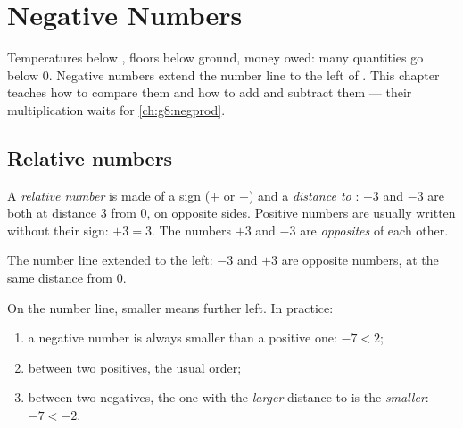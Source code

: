 \chapter{Negative Numbers}\label{ch:g7:negatives}

Temperatures below , floors below ground, money owed: many
quantities go below $0$. Negative numbers extend the number line to the
left of . This chapter teaches how to compare them and how to add
and subtract them --- their multiplication waits for
\cref{ch:g8:negprod}.

\section{Relative numbers}

\begin{definition}\label{def:g7:negatives:def}
A \emph{relative number} is made of a sign
($+$ or $-$) and a \emph{distance to }: $+3$ and $-3$ are both at
distance $3$ from $0$, on opposite sides. Positive numbers are usually
written without their sign: $+3 = 3$. The numbers $+3$ and $-3$ are
\emph{opposites} of each other.
\end{definition}

\begin{omfigure}

{\small The number line extended to the left: $-3$ and $+3$ are
opposite numbers, at the same distance from $0$.}
\end{omfigure}

\begin{method}\label{met:g7:negatives:compare}
On the number line, smaller means further left. In practice:
\begin{enumerate}
  \item a negative number is always smaller than a positive one:
        $-7 < 2$;
  \item between two positives, the usual order;
  \item between two negatives, the one with the \emph{larger} distance
        to  is the \emph{smaller}: $-7 < -2$.
\end{enumerate}
\end{method}

